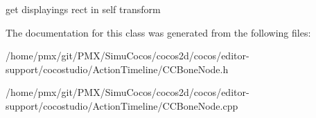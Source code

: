 get displayings rect in self transform 

The documentation for this class was generated from the following files\+:\begin{DoxyCompactItemize}
\item 
/home/pmx/git/\+P\+M\+X/\+Simu\+Cocos/cocos2d/cocos/editor-\/support/cocostudio/\+Action\+Timeline/C\+C\+Bone\+Node.\+h\item 
/home/pmx/git/\+P\+M\+X/\+Simu\+Cocos/cocos2d/cocos/editor-\/support/cocostudio/\+Action\+Timeline/C\+C\+Bone\+Node.\+cpp\end{DoxyCompactItemize}
